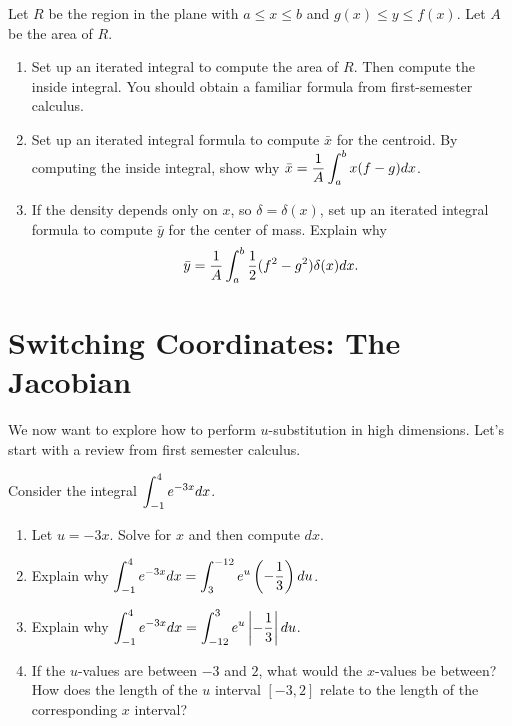 \begin{problem}
Let $R$ be the region in the plane with $a\leq x\leq b$ and $g(x)\leq y\leq f(x)$.  Let $A$ be the area of $R$.
\begin{enumerate}
 \item Set up an iterated integral to compute the area of $R$.  Then compute the inside integral. You should obtain a familiar formula from first-semester calculus.
 \item 
Set up an iterated integral formula to compute $\bar x$ for the centroid. By computing the inside integral, show why $\displaystyle\bar x = \frac{1}{A}\int_a^b x (f-g)dx$.
 \item If the density depends only on $x$, so $\delta = \delta (x)$, set up an iterated integral formula to compute $\bar y$ for the center of mass. Explain why $$\displaystyle\bar y = \frac{1}{A}\int_a^b  \frac{1}{2}(f^2-g^2)\delta(x)dx.$$
\end{enumerate}
\end{problem}


\section{Switching Coordinates: The Jacobian}

We now want to explore how to perform $u$-substitution in high dimensions. Let's start with a review from first semester calculus.

\begin{problem}
Consider the integral $\displaystyle\int_{-1}^4 e^{-3x} dx$.  
\begin{enumerate}
 \item Let $u=-3x$.  Solve for $x$ and then compute $dx$.
 \item Explain why $\displaystyle\int_{-1}^4 e^{-3x} dx=\int_{3}^{-12}e^u \left(-\frac{1}{3}\right)du$.  
 \item Explain why $\displaystyle\int_{-1}^4 e^{-3x} dx=\int_{-12}^{3}e^u \left|-\frac{1}{3}\right| du$.
 \item If the $u$-values are between $-3$ and $2$, what would the $x$-values be between? How does the  length of the $u$ interval $[-3,2]$ relate to the length of the corresponding $x$ interval?
\end{enumerate}
\end{problem}

